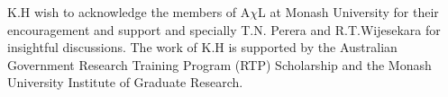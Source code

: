 \documentclass[
 reprint,
 amsmath,amssymb,
 aps,
 prb,
]{revtex4-2}
\begin{document}
\begin{acknowledgments}
K.H wish to acknowledge the members of A$\chi$L at Monash University for their encouragement and support and specially T.N. Perera and R.T.Wijesekara for insightful discussions. The work of K.H is supported by the Australian Government Research Training Program (RTP) Scholarship and the Monash University Institute of Graduate Research.
\end{acknowledgments}

\end{document}
